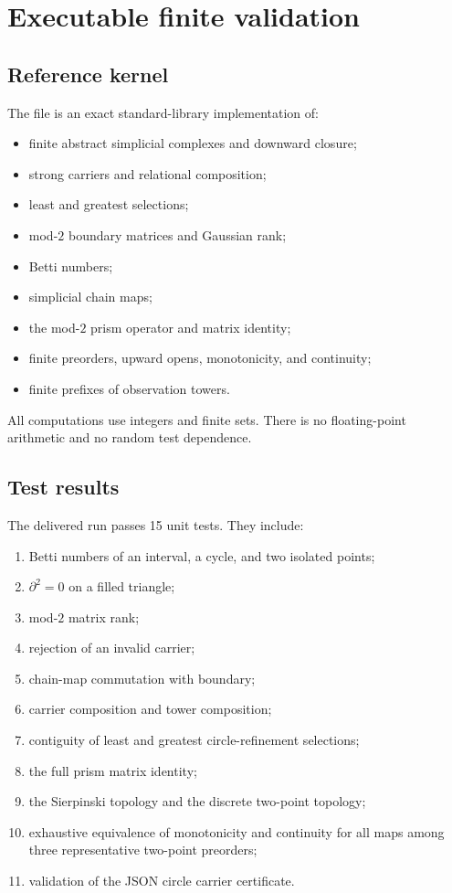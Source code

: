 
\section{Executable finite validation}
\label{sec:validation}

\subsection{Reference kernel}

The file  is an exact standard-library implementation of:
\begin{itemize}
  \item finite abstract simplicial complexes and downward closure;
  \item strong carriers and relational composition;
  \item least and greatest selections;
  \item mod-$2$ boundary matrices and Gaussian rank;
  \item Betti numbers;
  \item simplicial chain maps;
  \item the mod-$2$ prism operator and matrix identity;
  \item finite preorders, upward opens, monotonicity, and continuity;
  \item finite prefixes of observation towers.
\end{itemize}

All computations use integers and finite sets.  There is no floating-point arithmetic and no random test dependence.

\subsection{Test results}

The delivered run passes 15 unit tests.  They include:
\begin{enumerate}
  \item Betti numbers of an interval, a cycle, and two isolated points;
  \item $\partial^2=0$ on a filled triangle;
  \item mod-$2$ matrix rank;
  \item rejection of an invalid carrier;
  \item chain-map commutation with boundary;
  \item carrier composition and tower composition;
  \item contiguity of least and greatest circle-refinement selections;
  \item the full prism matrix identity;
  \item the Sierpinski topology and the discrete two-point topology;
  \item exhaustive equivalence of monotonicity and continuity for all maps among three representative two-point preorders;
  \item validation of the JSON circle carrier certificate.
\end{enumerate}

